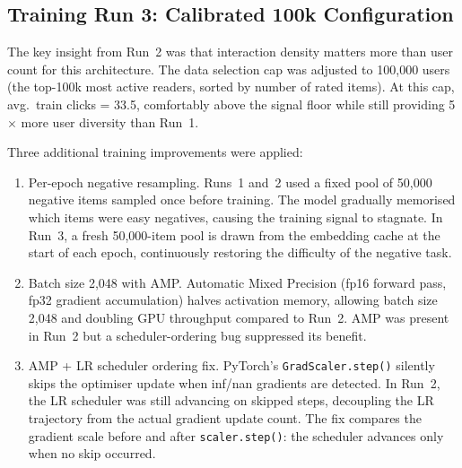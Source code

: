 \subsection{Training Run 3: Calibrated 100k Configuration}
\label{sec:train_run3}

The key insight from Run~2 was that interaction density matters more than user count for this architecture.
The data selection cap was adjusted to 100{,}000 users (the top-100k most active readers, sorted by number of rated items).
At this cap, avg.\ train clicks = 33.5, comfortably above the signal floor while still providing 5$\times$ more user diversity than Run~1.

Three additional training improvements were applied:

\begin{enumerate}
    \item Per-epoch negative resampling.
    Runs~1 and~2 used a fixed pool of 50{,}000 negative items sampled once before training.
    The model gradually memorised which items were easy negatives, causing the training signal to stagnate.
    In Run~3, a fresh 50{,}000-item pool is drawn from the embedding cache at the start of each epoch, continuously restoring the difficulty of the negative task.

    \item Batch size 2{,}048 with AMP.
    Automatic Mixed Precision (fp16 forward pass, fp32 gradient accumulation) halves activation memory, allowing batch size 2{,}048 and doubling GPU throughput compared to Run~2.
    AMP was present in Run~2 but a scheduler-ordering bug suppressed its benefit.

    \item AMP + LR scheduler ordering fix.
    PyTorch's \texttt{GradScaler.step()} silently skips the optimiser update when inf/nan gradients are detected.
    In Run~2, the LR scheduler was still advancing on skipped steps, decoupling the LR trajectory from the actual gradient update count.
    The fix compares the gradient scale before and after \texttt{scaler.step()}: the scheduler advances only when no skip occurred.
\end{enumerate}

